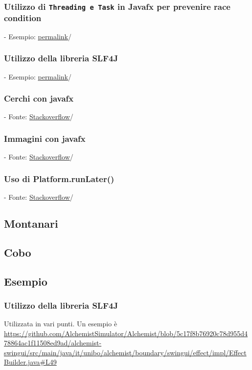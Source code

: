 \documentclass[a4paper,12pt]{report}
\begin{document}
\subsubsection{Utilizzo di \texttt{Threading e Task} in Javafx per prevenire race condition} - Esempio: \href{https://google.com}{permalink}/ 
\subsubsection{Utilizzo della libreria SLF4J} - Esempio: \href{https://google.com}{permalink}/ 
\subsubsection{Cerchi con javafx} - Fonte: \href{https://stackoverflow.com/questions/70876114/click-to-draw-a-shape-circle}{Stackoverflow}/ 
\subsubsection{Immagini con javafx} - Fonte: \href{https://stackoverflow.com/questions/52229984/javafx-imageview-actions}{Stackoverflow}/ 
\subsubsection{Uso di Platform.runLater()} - Fonte: \href{https://stackoverflow.com/questions/13784333/platform-runlater-and-task-in-javafx}{Stackoverflow}/ 

\subsection{Montanari}
\subsection{Cobo}

\subsection{Esempio}

\subsubsection{Utilizzo della libreria SLF4J}

Utilizzata in vari punti.
Un esempio è \url{https://github.com/AlchemistSimulator/Alchemist/blob/5c17f8b76920c78d955d478864ac1f11508ed9ad/alchemist-swingui/src/main/java/it/unibo/alchemist/boundary/swingui/effect/impl/EffectBuilder.java#L49}
\end{document}
